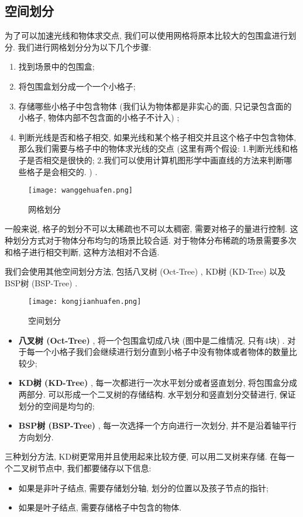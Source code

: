 \subsection{空间划分}
为了可以加速光线和物体求交点, 我们可以使用网格将原本比较大的包围盒进行划分. 我们进行网格划分分为以下几个步骤: 
\begin{enumerate}
	\item 找到场景中的包围盒; 
	\item 将包围盒划分成一个一个小格子; 
	\item 存储哪些小格子中包含物体 (我们认为物体都是非实心的面, 只记录包含面的小格子, 物体内部不包含面的小格子不计入) ; 
	\item 判断光线是否和格子相交, 如果光线和某个格子相交并且这个格子中包含物体, 那么我们需要与格子中的物体求光线的交点 (这里有两个假设: 1.判断光线和格子是否相交是很快的; 2.我们可以使用计算机图形学中画直线的方法来判断哪些格子是会相交的. ) . 
\end{enumerate}
\begin{figure}[H]
	\centering
	\texttt{[image: wanggehuafen.png]}
	\caption{网格划分}
	\label{fig:wghf}
\end{figure}
一般来说, 格子的划分不可以太稀疏也不可以太稠密, 需要对格子的量进行控制. 这种划分方式对于物体分布均匀的场景比较合适. 对于物体分布稀疏的场景需要多次和格子进行相交判断, 这种方法相对不合适. 

我们会使用其他空间划分方法, 包括八叉树 (Oct-Tree) , KD树 (KD-Tree) 以及BSP树 (BSP-Tree) . 
\begin{figure}[H]
	\centering
	\texttt{[image: kongjianhuafen.png]}
	\caption{空间划分}
	\label{fig:kjhf}
\end{figure}
\begin{itemize}
	\item \textbf{八叉树 (Oct-Tree) }, 将一个包围盒切成八块 (图中是二维情况, 只有4块) . 对于每一个小格子我们会继续进行划分直到小格子中没有物体或者物体的数量比较少; 
	\item \textbf{KD树 (KD-Tree) }, 每一次都进行一次水平划分或者竖直划分, 将包围盒分成两部分. 可以形成一个二叉树的存储结构. 水平划分和竖直划分交替进行, 保证划分的空间是均匀的; 
	\item \textbf{BSP树 (BSP-Tree) }, 每一次选择一个方向进行一次划分, 并不是沿着轴平行方向划分. 
\end{itemize}
三种划分方法, KD树更常用并且使用起来比较方便, 可以用二叉树来存储. 在每一个二叉树节点中, 我们都要储存以下信息: 
\begin{itemize}
	\item 如果是非叶子结点, 需要存储划分轴, 划分的位置以及孩子节点的指针; 
	\item 如果是叶子结点, 需要存储格子中包含的物体. 
\end{itemize}

